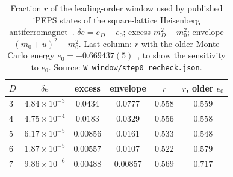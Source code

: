 \documentclass[aps,prx,onecolumn,10pt,nofootinbib,longbibliography,floatfix]{revtex4-2}
\theoremstyle{remark}
\newcommand{\de}{\delta e}
\begin{document}
\begin{table}[ht]
\caption{\label{tab:window_ipeps}Fraction $r$ of the leading-order window used by published iPEPS states of the
square-lattice Heisenberg antiferromagnet~\cite{hasik2021}. $\de=e_D-e_0$; excess $m_D^2-m_0^2$; envelope
$(m_0+u)^2-m_0^2$. Last column: $r$ with the older Monte Carlo energy $e_0=-0.669437(5)$~\cite{sandvik1997}, to show %
the sensitivity to $e_0$. Source: \texttt{W\_window/step0\_recheck.json}.}
\begin{ruledtabular}
\begin{tabular}{lccccc}
$D$ & $\de$ & excess & envelope & $r$ & $r$, older $e_0$\\
\hline
$3$ & $4.84\times10^{-3}$ & $0.0434$ & $0.0777$ & $0.558$ & $0.559$\\ %
$4$ & $4.75\times10^{-4}$ & $0.0183$ & $0.0329$ & $0.556$ & $0.558$\\ %
$5$ & $6.17\times10^{-5}$ & $0.00856$ & $0.0161$ & $0.533$ & $0.548$\\ %
$6$ & $1.87\times10^{-5}$ & $0.00557$ & $0.0107$ & $0.522$ & $0.579$\\ %
$7$ & $9.86\times10^{-6}$ & $0.00488$ & $0.00857$ & $0.569$ & $0.717$\\ %
\end{tabular}
\end{ruledtabular}
\end{table}
\end{document}
